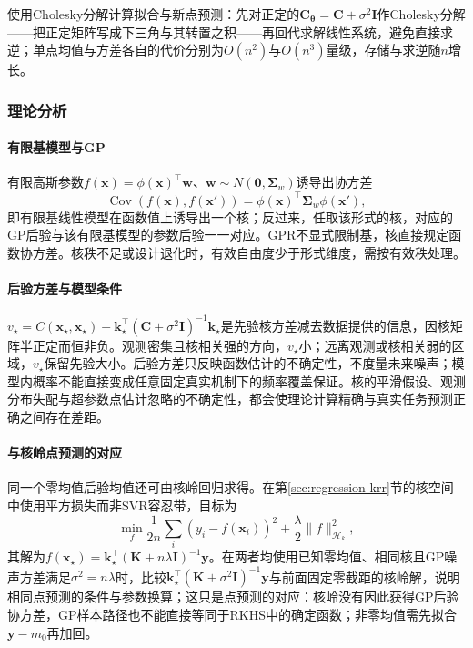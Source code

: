 使用Cholesky分解计算拟合与新点预测：先对正定的$\bm{C}_{\bm{\theta}}=\bm{C}+\sigma^2\bm{I}$作Cholesky分解——把正定矩阵写成下三角与其转置之积——再回代求解线性系统，避免直接求逆；单点均值与方差各自的代价分别为$O(n^2)$与$O(n^3)$量级，存储与求逆随$n$增长。

\subsubsection{理论分析}
\label{sec:regression-gpr-theory}

\paragraph{有限基模型与GP}

有限高斯参数$f(\bm{x})=\phi(\bm{x})^{\top}\bm{w}$、$\bm{w}\sim N(\bm{0},\bm{\Sigma}_w)$诱导出协方差
\[
  \operatorname{Cov}(f(\bm{x}),f(\bm{x}'))=\phi(\bm{x})^{\top}\bm{\Sigma}_w\phi(\bm{x}'),
\]
即有限基线性模型在函数值上诱导出一个核；反过来，任取该形式的核，对应的GP后验与该有限基模型的参数后验一一对应。GPR不显式限制基，核直接规定函数协方差。核秩不足或设计退化时，有效自由度少于形式维度，需按有效秩处理。

\paragraph{后验方差与模型条件}

$v_\star=C(\bm{x}_\star,\bm{x}_\star)-\bm{k}_\star^{\top}(\bm{C}+\sigma^2\bm{I})^{-1}\bm{k}_\star$是先验核方差减去数据提供的信息，因核矩阵半正定而恒非负。观测密集且核相关强的方向，$v_\star$小；远离观测或核相关弱的区域，$v_\star$保留先验大小。后验方差只反映函数估计的不确定性，不度量未来噪声；模型内概率不能直接变成任意固定真实机制下的频率覆盖保证。核的平滑假设、观测分布失配与超参数点估计忽略的不确定性，都会使理论计算精确与真实任务预测正确之间存在差距。

\paragraph{与核岭点预测的对应}

同一个零均值后验均值还可由核岭回归求得。在第\ref{sec:regression-krr}节的核空间中使用平方损失而非SVR容忍带，目标为
\[
  \min_f\frac{1}{2n}\sum_i(y_i-f(\bm{x}_i))^2+\frac{\lambda}{2}\lVert f\rVert_{\mathcal H_k}^2,
\]
其解为$f(\bm{x}_\star)=\bm{k}_\star^{\top}(\bm{K}+n\lambda\bm{I})^{-1}\bm{y}$。在两者均使用已知零均值、相同核且GP噪声方差满足$\sigma^2=n\lambda$时，比较$\bm{k}_\star^{\top}(\bm{K}+\sigma^2\bm{I})^{-1}\bm{y}$与前面固定零截距的核岭解，说明相同点预测的条件与参数换算；这只是点预测的对应：核岭没有因此获得GP后验协方差，GP样本路径也不能直接等同于RKHS中的确定函数；非零均值需先拟合$\bm{y}-m_0$再加回。

